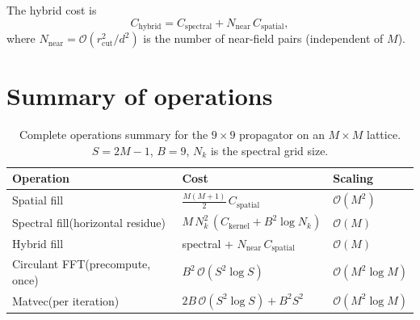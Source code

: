 \documentclass[11pt,a4paper]{article}
\newcommand{\order}[1]{\mathcal{O}\!\left(#1\right)}
\begin{document}
The hybrid cost is
\begin{equation}
  C_{\text{hybrid}} = C_{\text{spectral}}
  + N_{\text{near}}\,C_{\text{spatial}},
\end{equation}
where $N_{\text{near}} = \order{r_{\text{cut}}^2/d^2}$
is the number of near-field pairs (independent of $M$).


\section{Summary of operations}\label{sec:summary}

\begin{table}[ht]
\centering
\caption{Complete operations summary for the $9\times 9$
  propagator on an $M\times M$ lattice.
  $S = 2M{-}1$, $B = 9$, $N_k$ is the spectral grid size.}
\label{tab:summary}
\begin{tabular}{@{}p{3.8cm}p{5.5cm}p{3cm}@{}}
\toprule
Operation & Cost & Scaling \\
\midrule
Spatial fill
  & $\frac{M(M{+}1)}{2}\,C_{\text{spatial}}$
  & $\order{M^2}$ \\[4pt]
Spectral fill\newline (horizontal residue)
  & $M\,N_k^2\,(C_{\text{kernel}}+B^2\log N_k)$
  & $\order{M}$ \\[4pt]
Hybrid fill
  & spectral + $N_{\text{near}}\,C_{\text{spatial}}$
  & $\order{M}$ \\[4pt]
Circulant FFT\newline (precompute, once)
  & $B^2\,\order{S^2\log S}$
  & $\order{M^2\log M}$ \\[4pt]
Matvec\newline (per iteration)
  & $2B\,\order{S^2\log S} + B^2 S^2$
  & $\order{M^2\log M}$ \\
\bottomrule
\end{tabular}
\end{table}
\end{document}
